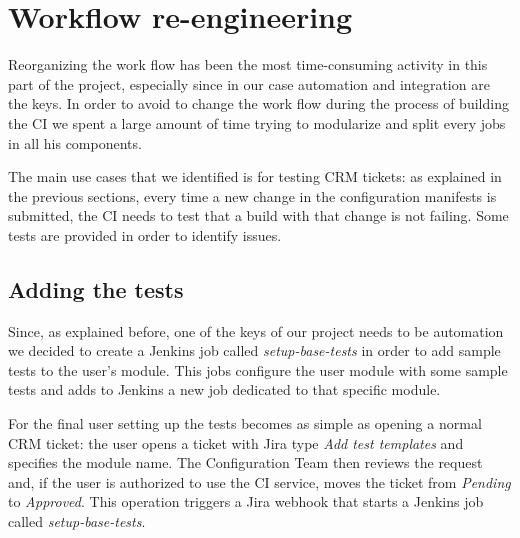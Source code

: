 \section{Workflow re-engineering}

Reorganizing the work flow has been the most time-consuming activity in
this part of the project, especially since in our case automation and
integration are the keys. In order to avoid to change the work flow during
the process of building the CI we spent a large amount of time trying to
modularize and split every jobs in all his components.

The main use cases that we identified is for testing CRM tickets: as
explained in the previous sections, every time a new change in the
configuration manifests is submitted, the CI needs to test that a build
with that change is not failing. Some tests are provided in order to
identify issues.
  
\subsection{Adding the tests}

Since, as explained before, one of the keys of our project needs to be
automation we decided to create a Jenkins job called
\textit{setup-base-tests} in order to add sample tests to the user's
module. This jobs configure the user module with some sample tests and
adds to Jenkins a new job dedicated to that specific module.

For the final user setting up the tests becomes as simple as opening
a normal CRM ticket: the user opens a ticket with Jira type \textit{Add
test templates} and specifies the module name. The Configuration Team then
reviews the request and, if the user is authorized to use the CI service,
moves the ticket from \textit{Pending} to \textit{Approved}. This
operation triggers a Jira webhook that starts a Jenkins job called
\textit{setup-base-tests}.

